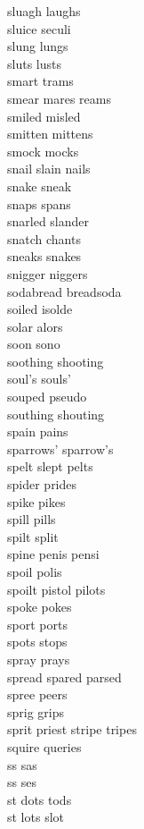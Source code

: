 sluagh laughs\\
sluice seculi\\
slung lungs\\
sluts lusts\\
smart trams\\
smear mares reams\\
smiled misled\\
smitten mittens\\
smock mocks\\
snail slain nails\\
snake sneak\\
snaps spans\\
snarled slander\\
snatch chants\\
sneaks snakes\\
snigger niggers\\
sodabread breadsoda\\
soiled isolde\\
solar alors\\
soon sono\\
soothing shooting\\
soul's souls'\\
souped pseudo\\
southing shouting\\
spain pains\\
sparrows' sparrow's\\
spelt slept pelts\\
spider prides\\
spike pikes\\
spill pills\\
spilt split\\
spine penis pensi\\
spoil polis\\
spoilt pistol pilots\\
spoke pokes\\
sport ports\\
spots stops\\
spray prays\\
spread spared parsed\\
spree peers\\
sprig grips\\
sprit priest stripe tripes \\
squire queries \\
ss sas \\
ss ses \\
st dots tods  \\
st lots slot  \\
